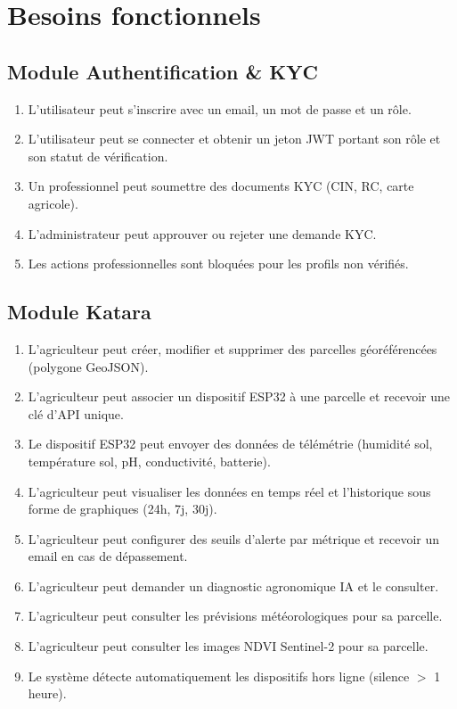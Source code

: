 \documentclass[12pt,a4paper]{report}
\begin{document}
\section{Besoins fonctionnels}

\subsection*{Module Authentification \& KYC}
\begin{enumerate}[label=BF-AUTH-\arabic*]
  \item L'utilisateur peut s'inscrire avec un email, un mot de passe et un rôle.
  \item L'utilisateur peut se connecter et obtenir un jeton JWT portant son rôle et
        son statut de vérification.
  \item Un professionnel peut soumettre des documents KYC (CIN, RC, carte agricole).
  \item L'administrateur peut approuver ou rejeter une demande KYC.
  \item Les actions professionnelles sont bloquées pour les profils non vérifiés.
\end{enumerate}

\subsection*{Module Katara}
\begin{enumerate}[label=BF-KAT-\arabic*]
  \item L'agriculteur peut créer, modifier et supprimer des parcelles géoréférencées
        (polygone GeoJSON).
  \item L'agriculteur peut associer un dispositif ESP32 à une parcelle et recevoir une
        clé d'API unique.
  \item Le dispositif ESP32 peut envoyer des données de télémétrie (humidité sol,
        température sol, pH, conductivité, batterie).
  \item L'agriculteur peut visualiser les données en temps réel et l'historique sous
        forme de graphiques (24h, 7j, 30j).
  \item L'agriculteur peut configurer des seuils d'alerte par métrique et recevoir un
        email en cas de dépassement.
  \item L'agriculteur peut demander un diagnostic agronomique IA et le consulter.
  \item L'agriculteur peut consulter les prévisions météorologiques pour sa parcelle.
  \item L'agriculteur peut consulter les images NDVI Sentinel-2 pour sa parcelle.
  \item Le système détecte automatiquement les dispositifs hors ligne
        (silence $>$ 1 heure).
\end{enumerate}
\end{document}
